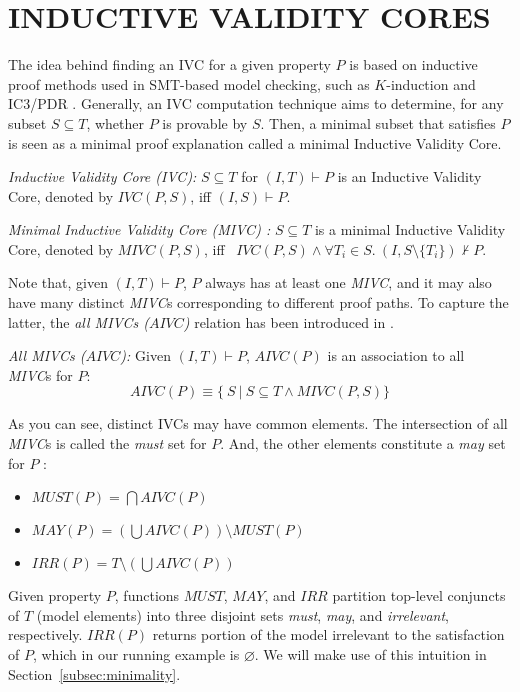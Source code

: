\section{INDUCTIVE VALIDITY CORES}
\label{sec:ivc}

\newcommand{\ivc}{\textit{IVC}}
\newcommand{\mivc}{\textit{MIVC}}



The idea behind finding an IVC for a given property $P$ \cite{Ghass16} is based on inductive proof methods used in SMT-based model checking, such as $K$-induction and IC3/PDR \cite{NFM2012:KaGaTiWh, amla2005analysis, Een2011:PDR}. Generally, an IVC computation technique aims to determine, for any subset $S \subseteq T$, whether $P$ is provable by $S$. Then, a minimal subset that satisfies $P$ is seen as a minimal proof explanation called a minimal Inductive Validity Core.

\begin{definition}{\emph{Inductive Validity Core (\ivc)\cite{Ghass16}:}}
  \label{def:ivc}
  $S \subseteq T$ for $(I, T)\vdash P$ is an Inductive Validity Core,
  denoted by $\ivc(P, S)$, iff $(I, S) \vdash P $.
\end{definition}

\begin{definition}{\emph{Minimal Inductive Validity Core (\mivc) \cite{Ghass16}:}}
  \label{def:minimal-ivc}
  $S \subseteq T$ is a minimal Inductive Validity Core,
  denoted by $\mivc(P, S)$, iff ~$\ivc(P, S) \wedge \forall T_i \in S.~ (I, S\setminus\{ T_i \}) \nvdash P$.
\end{definition}


Note that, given $(I, T) \vdash P$, $P$ always has at least one \mivc, and it may also have many distinct \mivc s corresponding to different proof paths. To capture the latter, the \emph{all \mivc s ($AIVC$)} relation has been introduced in \cite{Murugesan16:renext}.
\begin{definition}{\emph{All \mivc s ($AIVC$):}}
    \label{def:allivcs}
    Given $(I, T) \vdash P$, $AIVC(P)$ is an association to all \mivc s for $P$:
    $$ AIVC(P) \equiv  \{\ S~|~S \subseteq T \land  MIVC(P, S)\} $$
\end{definition}



As you can see, distinct IVCs may have common elements.
The intersection of all \mivc s is called the \emph{must} set for $P$.
And, the other elements constitute a \emph{may} set for $P$ \cite{Murugesan16:renext}:
\begin{itemize}
  \item   $MUST (P) = \bigcap AIVC(P)$
  \item  $MAY(P) = (\bigcup AIVC (P)) \setminus MUST(P)$
  \item $IRR(P) = T \setminus (\bigcup AIVC(P))$
\end{itemize}
\noindent Given property $P$, functions $MUST$, $MAY$, and $IRR$ partition top-level conjuncts of $T$ (model elements) into three disjoint sets \emph{must}, \emph{may}, and \emph{irrelevant}, respectively. $IRR(P)$ returns portion of the model irrelevant to the satisfaction of $P$, which in our running example is $\varnothing$.
We will make use of this intuition in Section~\ref{subsec:minimality}.

